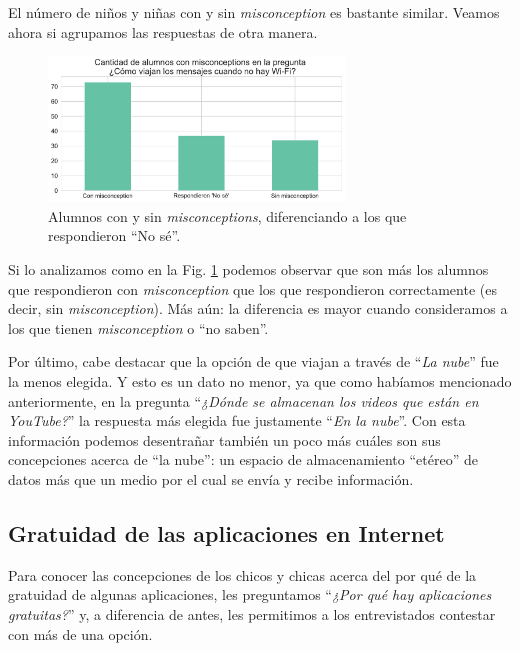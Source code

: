 El número de niños y niñas con y sin \textit{misconception} es bastante similar. Veamos ahora si agrupamos las respuestas de otra manera.

\begin{figure}[h]
    \centering
    \includegraphics[width=0.7\textwidth]{images_analisis/21.pdf}
    \caption{Alumnos con y sin \textit{misconceptions}, diferenciando a los que respondieron “No sé”.}
    \label{fig:analisis21}
\end{figure}

Si lo analizamos como en la Fig. \ref{fig:analisis21} podemos observar que son más los alumnos que respondieron con \textit{misconception} que los que respondieron correctamente (es decir, sin \textit{misconception}). Más aún: la diferencia es mayor cuando consideramos a los que tienen \textit{misconception} o “no saben”. 

Por último, cabe destacar que la opción de que viajan a través de ``\textit{La nube}'' fue la menos elegida. Y esto es un dato no menor, ya que como habíamos mencionado anteriormente, en la pregunta ``\textit{¿Dónde se almacenan los videos que están en YouTube?}'' la respuesta más elegida fue justamente ``\textit{En la nube}''. Con esta información podemos desentrañar también un poco más cuáles son sus concepciones acerca de ``la nube'': un espacio de almacenamiento ``etéreo'' de datos más que un medio por el cual se envía y recibe información.

\subsection{Gratuidad de las aplicaciones en Internet}


Para conocer las concepciones de los chicos y chicas acerca del por qué de la gratuidad de algunas aplicaciones, les preguntamos ``\textit{¿Por qué hay aplicaciones gratuitas?}'' y, a diferencia de antes, les permitimos a los entrevistados contestar con más de una opción.

